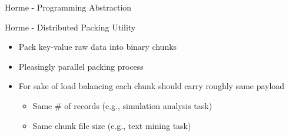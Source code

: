\documentclass[newPxFont]{beamer}
\makeatletter
\newcommand{\specialcell}[2][l]{%
  \begin{tabular}[#1]{@{}l@{}}#2\end{tabular}}
\makeatother
\begin{document}
\begin{frame}[c]{Horme - Programming Abstraction}
\end{frame}

\begin{frame}[c]{Horme - Distributed Packing Utility}
  \begin{itemize}
    \item Pack key-value raw data into binary chunks
    \item Pleasingly parallel packing process
    \item For sake of load balancing each chunk should carry roughly same payload
    \begin{itemize}
      \item Same \# of records (e.g., simulation analysis task)
      \item Same chunk file size (e.g., text mining task)
    \end{itemize}
  \end{itemize}
\end{frame}
\end{document}
